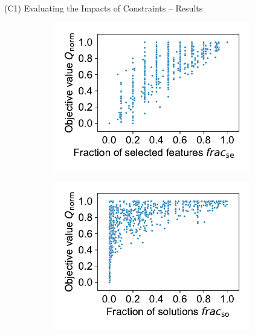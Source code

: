 \documentclass[en, navbarinline, handout]{sdqbeamer}
\begin{document}
\begin{frame}[t]{(C1) Evaluating the Impacts of Constraints -- Results}
	\begin{figure}
		\centering
		\begin{subfigure}{0.48\textwidth}
			\centering
			\includegraphics[width=0.95\textwidth, trim={0 15 0 10}, clip]{plots/syn-selected-vs-objective.pdf}
		\end{subfigure}
		\hfill
		\begin{subfigure}{0.48\textwidth}
			\centering
			\includegraphics[width=0.95\textwidth, trim={0 15 0 10}, clip]{plots/syn-solutions-vs-objective.pdf}

\end{subfigure}
\end{figure}
\end{frame}
\end{document}
